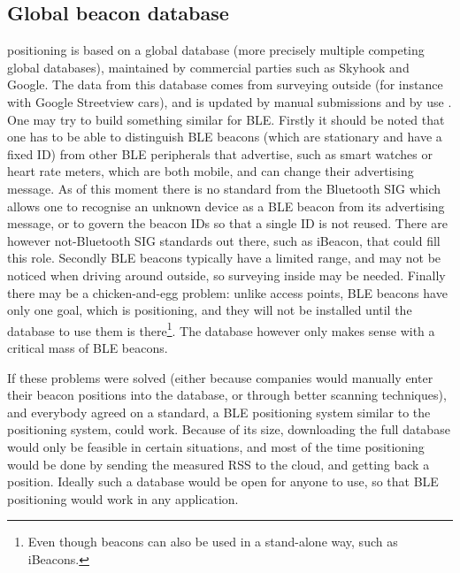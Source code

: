 \subsection{Global beacon database}
\Wifi positioning is based on a global database (more precisely multiple competing global databases), maintained by commercial parties such as Skyhook and Google.
The data from this database comes from surveying outside (for instance with Google Streetview cars), and is updated by manual submissions and by use .
One may try to build something similar for BLE.
Firstly it should be noted that one has to be able to distinguish BLE beacons (which are stationary and have a fixed ID) from other BLE peripherals that advertise, such as smart watches or heart rate meters, which are both mobile, and can change their advertising message.
As of this moment there is no standard from the Bluetooth SIG which allows one to recognise an unknown device as a BLE beacon from its advertising message, or to govern the beacon IDs so that a single ID is not reused.
There are however not-Bluetooth SIG standards out there, such as iBeacon, that could fill this role.
Secondly BLE beacons typically have a limited range, and may not be noticed when driving around outside, so surveying inside may be needed.
Finally there may be a chicken-and-egg problem: unlike \wifi access points, BLE beacons have only one goal, which is positioning, and they will not be installed until the database to use them is there\footnote{Even though beacons can also be used in a stand-alone way, such as iBeacons.}.
The database however only makes sense with a critical mass of BLE beacons.

If these problems were solved (either because companies would manually enter their beacon positions into the database, or through better scanning techniques), and everybody agreed on a standard, a BLE positioning system similar to the \wifi positioning system, could work.
Because of its size, downloading the full database would only be feasible in certain situations, and most of the time positioning would be done by sending the measured RSS to the cloud, and getting back a position.
Ideally such a database would be open for anyone to use, so that BLE positioning would work in any application.

